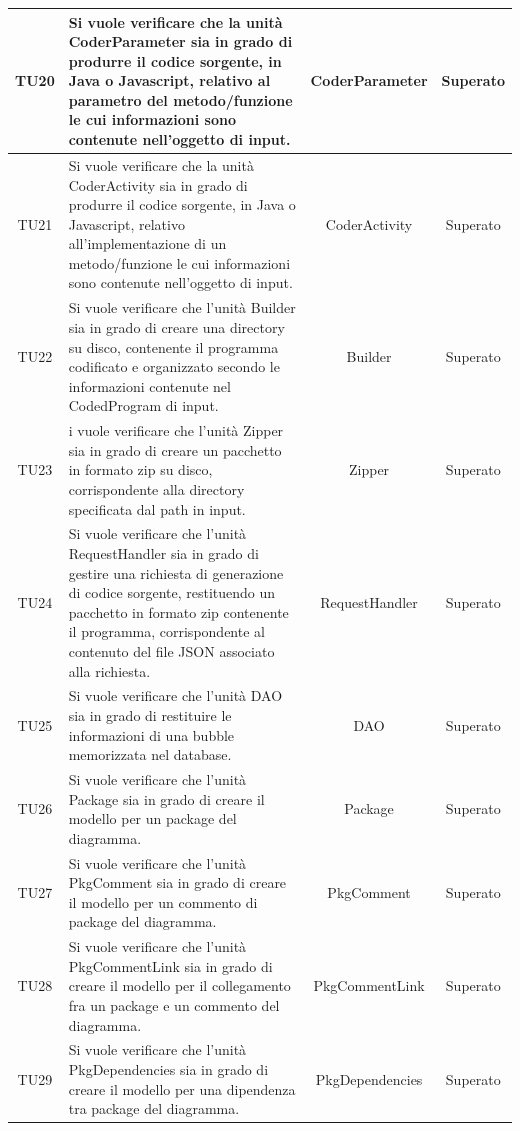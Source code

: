 \documentclass[../PianoDiQualifica.tex]{subfiles}
\begin{document}
\begin{longtable}{|c|>{\centering}p{8cm}|c|c|}
		\hline
		\hypertarget{TU20}{TU20}& Si vuole verificare che la unità CoderParameter sia in grado di produrre il codice sorgente, in Java o Javascript, relativo al parametro del metodo/funzione le cui informazioni sono contenute nell'oggetto di input.& CoderParameter&Superato\\
		\hline
		\hypertarget{TU21}{TU21}& Si vuole verificare che la unità CoderActivity sia in grado di produrre il codice sorgente, in Java o Javascript, relativo all'implementazione di un metodo/funzione le cui informazioni sono contenute nell'oggetto di input.& CoderActivity&Superato\\
		\hline
		\hypertarget{TU22}{TU22}& Si vuole verificare che l'unità Builder sia in grado di creare una directory su disco, contenente il programma codificato e organizzato secondo le informazioni contenute nel CodedProgram di input.& Builder&Superato\\
		\hline
		\hypertarget{TU23}{TU23}& i vuole verificare che l'unità Zipper sia in grado di creare un pacchetto in formato zip su disco, corrispondente alla directory specificata dal path in input.& Zipper &Superato\\
		\hline
		\hypertarget{TU24}{TU24}& Si vuole verificare che l'unità RequestHandler sia in grado di gestire una richiesta di generazione di codice sorgente, restituendo un pacchetto in formato zip contenente il programma, corrispondente al contenuto del file JSON associato alla richiesta. &RequestHandler &Superato\\
		\hline
		\hypertarget{TU25}{TU25}&Si vuole verificare che l'unità DAO sia in grado di restituire le informazioni di una bubble memorizzata nel database.&DAO &Superato\\
		\hline
		\hypertarget{TU26}{TU26}&Si vuole verificare che l'unità Package sia in grado di creare il modello per un package del diagramma.&Package &Superato\\
		\hline
		\hypertarget{TU27}{TU27}&Si vuole verificare che l'unità PkgComment sia in grado di creare il modello per un commento di package del diagramma. &PkgComment &Superato\\
		\hline
		\hypertarget{TU28}{TU28}&Si vuole verificare che l'unità PkgCommentLink sia in grado di creare il modello per il collegamento fra un package e un commento del diagramma. & PkgCommentLink&Superato\\
		\hline
		\hypertarget{TU29}{TU29}& Si vuole verificare che l'unità PkgDependencies sia in grado di creare il modello per una dipendenza tra package del diagramma. & PkgDependencies &Superato\\

\end{longtable}
\end{document}
